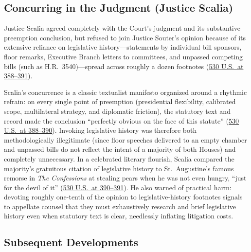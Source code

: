 \documentclass[12pt]{article}
\begin{document}
\subsection{Concurring in the Judgment (Justice Scalia)}

Justice Scalia agreed completely with the Court's judgment and its substantive preemption conclusion, but refused to join Justice Souter's opinion because of its extensive reliance on legislative history---statements by individual bill sponsors, floor remarks, Executive Branch letters to committees, and unpassed competing bills (such as H.R.\ 3540)---spread across roughly a dozen footnotes (\href{https://www.law.cornell.edu/supct/html/99-474.ZC.html}{530 U.S.\ at 388--391}).

Scalia's concurrence is a classic textualist manifesto organized around a rhythmic refrain: on every single point of preemption (presidential flexibility, calibrated scope, multilateral strategy, and diplomatic friction), the statutory text and record made the conclusion ``perfectly obvious on the face of this statute'' (\href{https://www.law.cornell.edu/supct/html/99-474.ZC.html}{530 U.S.\ at 388--390}). Invoking legislative history was therefore both methodologically illegitimate (since floor speeches delivered to an empty chamber and unpassed bills do not reflect the intent of a majority of both Houses) and completely unnecessary. In a celebrated literary flourish, Scalia compared the majority's gratuitous citation of legislative history to St.\ Augustine's famous remorse in \textit{The Confessions} at stealing pears when he was not even hungry, ``just for the devil of it'' (\href{https://www.law.cornell.edu/supct/html/99-474.ZC.html}{530 U.S.\ at 390--391}). He also warned of practical harm: devoting roughly one-tenth of the opinion to legislative-history footnotes signals to appellate counsel that they must exhaustively research and brief legislative history even when statutory text is clear, needlessly inflating litigation costs.

\subsection{Subsequent Developments}
\end{document}
